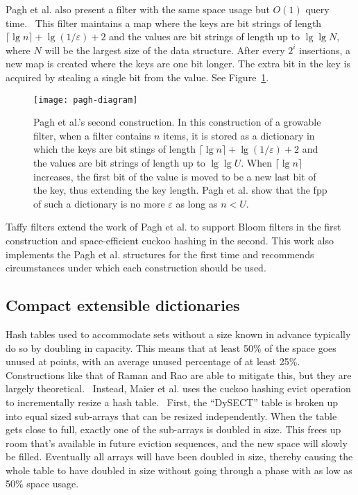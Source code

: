 \documentclass[sigconf, nonacm]{acmart}
\newcommand{\etal}{et al.}
\begin{document}
Pagh \etal{} also present a filter with the same space usage but $O(1)$ query time.~\cite{psw}
This filter maintains a map where the keys are bit strings of length $\lceil \lg n \rceil + \lg (1/\varepsilon) + 2$ and the values are bit strings of length up to $\lg \lg N$, where $N$ will be the largest size of the data structure.
After every $2^i$ insertions, a new map is created where the keys are one bit longer.
The extra bit in the key is acquired by stealing a single bit from the value.
See Figure~\ref{pagh-diagram}.

\begin{figure}
\texttt{[image: pagh-diagram]}
\caption{\label{pagh-diagram}
Pagh \etal{}'s second construction.
In this construction of a growable filter, when a filter contains $n$ items, it is stored as a dictionary in which the keys are bit stings of length $\lceil \lg n \rceil + \lg (1/\varepsilon) + 2$ and the values are bit strings of length up to $\lg \lg U$.
When $\lceil \lg n \rceil$ increases, the first bit of the value is moved to be a new last bit of the key, thus extending the key length.
Pagh \etal{} show that the fpp of such a dictionary is no more $\varepsilon$ as long as $n < U$.
}
\end{figure}

Taffy filters extend the work of Pagh \etal{} to support Bloom filters in the first construction and space-efficient cuckoo hashing in the second.
This work also implements the Pagh \etal{} structures for the first time and recommends circumstances under which each construction should be used.




\subsection{Compact extensible dictionaries}

Hash tables used to accommodate sets without a size known in advance typically do so by doubling in capacity.
This means that at least 50\% of the space goes unused at points, with an average unused percentage of at least 25\%.
Constructions like that of Raman and Rao are able to mitigate this, but they are largely theoretical.~\cite{succinct}
Instead, Maier \etal{} uses the cuckoo hashing evict operation to incrementally resize a hash table.~\cite{dysect}
First, the ``DySECT'' table is broken up into equal sized sub-arrays that can be resized independently.
When the table gets close to full, exactly one of the sub-arrays is doubled in size.
This frees up room that's available in future eviction sequences, and the new space will slowly be filled.
Eventually all arrays will have been doubled in size, thereby causing the whole table to have doubled in size without going through a phase with as low as 50\% space usage.
\end{document}
